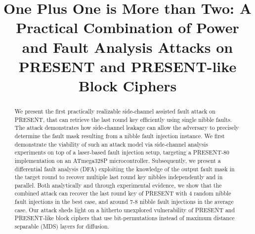 \documentclass[10pt, conference, compsocconf]{IEEEtran}  %
\numberwithin{Definition}{section}
\numberwithin{Claim}{section}
\begin{document}
\title{One Plus One is More than Two: A Practical Combination of Power and Fault Analysis Attacks on PRESENT and PRESENT-like Block Ciphers}


\author{
\and
{}
\IEEEauthorblockA{Temasek Labs, NTU Singapore\\
jbreier@ntu.edu.sg, sbhasin@ntu.edu.sg}}







\maketitle


\begin{abstract}

We present the first practically realizable side-channel assisted fault attack on PRESENT, that can retrieve the last round key efficiently using single nibble faults. The attack demonstrates how side-channel leakage can allow the adversary to precisely determine the fault mask resulting from a nibble fault injection instance. We first demonstrate the viability of such an attack model via side-channel analysis experiments on top of a laser-based fault injection setup, targeting a PRESENT-80 implementation on an ATmega328P microcontroller. Subsequently, we present a differential fault analysis (DFA) exploiting the knowledge of the output fault mask in the target round to recover multiple last round key nibbles independently and in parallel. Both analytically and through experimental evidence, we show that the combined attack can recover the last round key of PRESENT with 4 random nibble fault injections in the best case, and around 7-8 nibble fault injections in the average case. Our attack sheds light on a hitherto unexplored vulnerability of PRESENT and PRESENT-like block ciphers that use bit-permutations instead of maximum distance separable (MDS) layers for diffusion.
\end{abstract}
\end{document}
